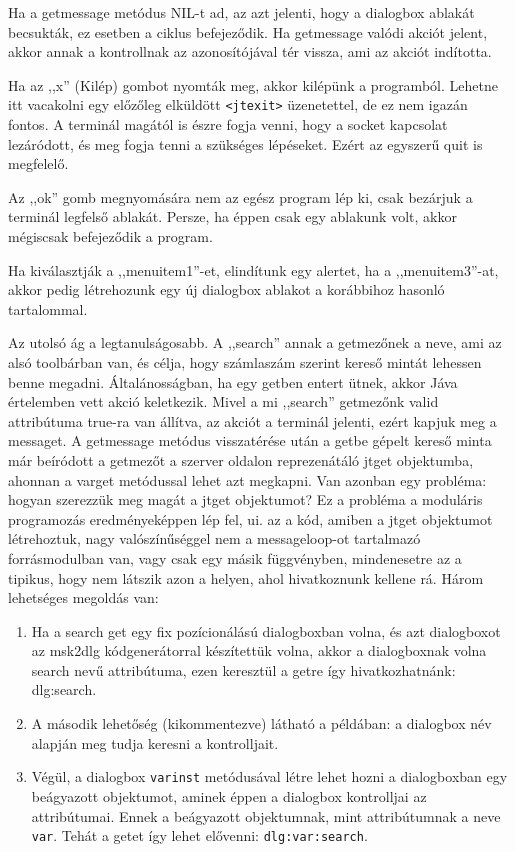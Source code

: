Ha a getmessage metódus NIL-t ad, az azt jelenti,
hogy a dialogbox ablakát becsukták, ez esetben a ciklus
befejeződik. Ha getmessage valódi akciót jelent, 
akkor annak a kontrollnak az azonosítójával tér vissza,
ami az akciót indította.

Ha az ,,x'' (Kilép) gombot nyomták meg, akkor kilépünk a programból.
Lehetne itt vacakolni egy előzőleg elküldött \verb!<jtexit>!
üzenetettel, de ez nem igazán fontos. A terminál magától
is észre fogja venni, hogy a socket kapcsolat lezáródott, 
és meg fogja tenni a szükséges lépéseket. 
Ezért az egyszerű quit is megfelelő.

Az ,,ok'' gomb megnyomására nem az egész program lép ki,
csak bezárjuk a terminál legfelső ablakát. Persze, ha éppen csak
egy ablakunk volt, akkor mégiscsak befejeződik a program.


Ha kiválasztják a ,,menuitem1''-et, elindítunk egy alertet,
ha a ,,menuitem3''-at, akkor pedig létrehozunk egy új dialogbox ablakot
a korábbihoz hasonló tartalommal. 

Az utolsó ág a legtanulságosabb. A ,,search'' annak a getmezőnek
a neve, ami az alsó toolbárban van, és célja, hogy számlaszám
szerint kereső mintát lehessen benne megadni.
Általánosságban, ha egy getben entert ütnek, 
akkor Jáva értelemben vett akció keletkezik. 
Mivel a mi ,,search'' getmezőnk valid attribútuma true-ra van állítva,
az akciót a terminál jelenti, ezért kapjuk meg a messaget. 
A getmessage metódus visszatérése után a getbe gépelt kereső 
minta már beíródott a getmezőt a szerver oldalon 
reprezenátáló jtget objektumba, ahonnan a varget metódussal
lehet azt megkapni. Van azonban egy probléma: hogyan szerezzük 
meg magát a jtget objektumot? Ez a probléma a moduláris programozás
eredményeképpen lép fel, ui. az a kód, amiben a jtget objektumot
létrehoztuk, nagy valószínűséggel nem a messageloop-ot tartalmazó
forrásmodulban van, vagy csak egy másik függvényben, mindenesetre
az a tipikus, hogy nem látszik azon a helyen, ahol hivatkoznunk 
kellene rá. Három lehetséges megoldás van:

\begin{enumerate} 
\item
   Ha a search get egy fix pozícionálású dialogboxban volna,
   és azt dialogboxot az msk2dlg kódgenerátorral készítettük
   volna, akkor a dialogboxnak volna search nevű attribútuma,
   ezen keresztül a getre így hivatkozhatnánk: dlg:search.
\item
   A második lehetőség (kikommentezve) látható a példában:
   a dialogbox név alapján meg tudja keresni a kontrolljait.
\item
   Végül, a dialogbox \verb!varinst! metódusával létre lehet hozni
   a dialogboxban egy beágyazott objektumot, 
   aminek éppen a dialogbox kontrolljai az attribútumai.
   Ennek a beágyazott objektumnak, mint attribútumnak a neve \verb!var!.
   Tehát a getet így lehet elővenni: \verb!dlg:var:search!.
\end{enumerate} 
 
